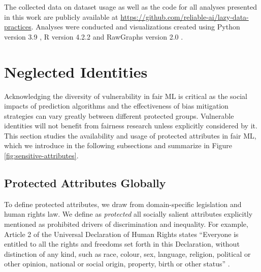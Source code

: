 The collected data on dataset usage as well as the code for all analyses presented in this work are publicly available at \url{https://github.com/reliable-ai/lazy-data-practices}. Analyses were conducted and visualizations created using Python version 3.9 \citep{van1995python}, R version 4.2.2 \citep{rcoreteam2022r} and RawGraphs version 2.0 \citep{mauri2017rawgraphs}.

\section{Neglected Identities} \label{sec:neglected}

Acknowledging the diversity of vulnerability in fair ML is critical as the social impacts of prediction algorithms and the effectiveness of bias mitigation strategies can vary greatly between different protected groups. Vulnerable identities will not benefit from fairness research unless explicitly considered by it. This section studies the availability and usage of protected attributes in fair ML, which we introduce in the following subsections and summarize in Figure \ref{fig:sensitive-attributes}.

\subsection{Protected Attributes Globally}
To define protected attributes, we draw from domain-specific legislation and human rights law. We define as \emph{protected} all socially salient attributes explicitly mentioned as prohibited drivers of discrimination and inequality. For example, Article 2 of the Universal Declaration of Human Rights states ``Everyone is entitled to all the rights and freedoms set forth in this Declaration, without distinction of any kind, such as race, colour, sex, language, religion, political or other opinion, national or social origin, property, birth or other status'' \citep{un1948united}. 

